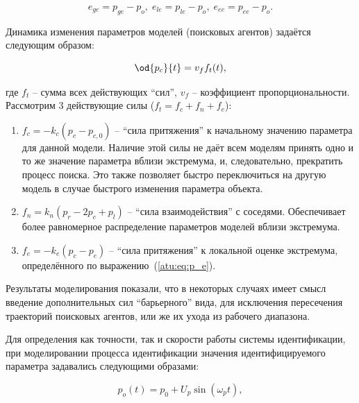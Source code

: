 \documentclass[a4paper,paratype,12pt,fouriernc]{cmonogra}
\begin{document}
\begin{equation}
  e_{ge} = p_{ge} - p_o, \;
  e_{le} = p_{le} - p_o, \;
  e_{ee} = p_{ee} - p_o.
  \label{atu:eq:e_xx}
\end{equation}


Динамика изменения параметров моделей (поисковых агентов) задаётся следующим образом:

\begin{equation}
  \od{p_c}{t} = v_f f_t(t),
  \label{atu:eq:dp_dt}
\end{equation}

\noindent
где $f_t$ -- сумма всех действующих ``сил'', $v_f$ -- коэффициент
пропорциональности. Рассмотрим 3 действующие силы
($ f_t = f_c + f_n + f_e $):

\begin{enumerate}
  \item
    $f_c = -k_c (p_c - p_{c,0}) $ -- ``сила притяжения'' к начальному значению
    параметра
    для данной модели. Наличие этой силы не даёт всем моделям принять одно
    и то же значение параметра вблизи экстремума, и, следовательно,
    прекратить процесс поиска. Это также позволяет быстро переключиться
    на другую модель в случае быстрого изменения параметра объекта.

  \item
    $f_n = k_n ( p_r - 2 p_c + p_l ) $ -- ``сила взаимодействия''
    с соседями. Обеспечивает более равномерное распределение
    параметров моделей вблизи экстремума.

  \item
    $f_e = - k_e ( p_c - p_e ) $ -- ``сила притяжения'' к локальной
    оценке экстремума, определённого по выражению~(\ref{atu:eq:p_e}).

\end{enumerate}

Результаты моделирования показали, что в некоторых случаях
имеет смысл введение дополнительных сил ``барьерного'' вида,
для исключения пересечения траекторий поисковых агентов, или же их ухода из рабочего диапазона.



Для определения как точности, так и скорости работы системы
идентификации, при моделировании процесса идентификации
значения идентифицируемого параметра задавались следующими образами:

\begin{equation}
  p_o(t) = p_0 +  U_{p} \sin( \omega_{p} t ),
  \label{atu:eq:p_sin}
\end{equation}
\end{document}
